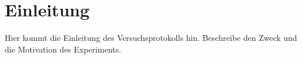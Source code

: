 \section{Einleitung}
Hier kommt die Einleitung des Versuchsprotokolls hin. Beschreibe den Zweck und die Motivation des Experiments.
